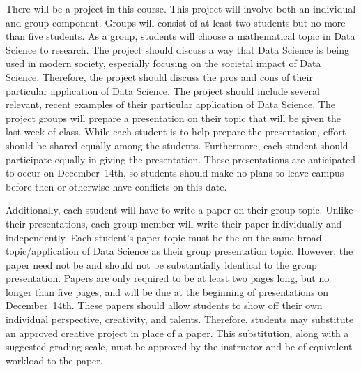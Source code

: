 \documentclass[11pt,letterpaper]{article}
\begin{document}
There will be a project in this course. This project will involve both an individual and group component. Groups will consist of at least two students but no more than five students. As a group, students will choose a mathematical topic in Data Science to research. The project should discuss a way that Data Science is being used in modern society, especially focusing on the societal impact of Data Science. Therefore, the project should discuss the pros and cons of their particular application of Data Science. The project should include several relevant, recent examples of their particular application of Data Science. The project groups will prepare a presentation on their topic that will be given the last week of class. While each student is to help prepare the presentation, effort should be shared equally among the students. Furthermore, each student should participate equally in giving the presentation. These presentations are anticipated to occur on December~14th, so students should make no plans to leave campus before then or otherwise have conflicts on this date. \pspace

Additionally, each student will have to write a paper on their group topic. Unlike their presentations, each group member will write their paper individually and independently. Each student's paper topic must be the on the same broad topic/application of Data Science as their group presentation topic. However, the paper need not be and should not be substantially identical to the group presentation. Papers are only required to be at least two pages long, but no longer than five pages, and will be due at the beginning of presentations on December~14th. These papers should allow students to show off their own individual perspective, creativity, and talents. Therefore, students may substitute an approved creative project in place of a paper. This substitution, along with a suggested grading scale, must be approved by the instructor and be of equivalent workload to the paper.
\sectionbreak
 




\newpage
\end{document}
